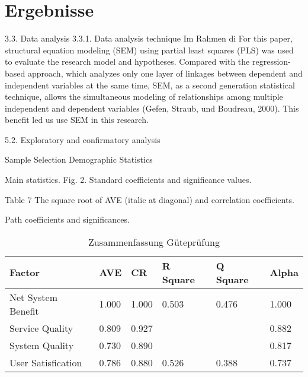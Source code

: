 \section{Ergebnisse}
\label{sec:ergebnisse}


3.3. Data analysis
3.3.1. Data analysis technique
Im Rahmen di
For this paper, structural equation modeling (SEM) using partial least squares (PLS) was used to evaluate the research model and hypotheses. Compared with the regression-based approach, which analyzes only one layer of linkages between dependent and independent variables at the same time, SEM, as a second generation statistical technique, allows the simultaneous modeling of relationships among multiple independent and dependent variables (Gefen, Straub,  und Boudreau, 2000). This benefit led us use SEM in this research.

5.2. Exploratory and confirmatory analysis

Sample Selection
Demographic Statistics

Main statistics.
Fig. 2. Standard coefficients and significance values.

Table 7
The square root of AVE (italic at diagonal) and correlation coefficients.

Path coefficients and significances.












\begin{table}[h] 
\caption{Zusammenfassung G\"utepr\"ufung}
\label{tab:Zusammenfassung} 
\begin{tabular}{|l|l|l|l|l|l|}
  \hline
\textbf{Factor} & \textbf{AVE} & \textbf{CR} & \textbf{R Square} & \textbf{Q Square} & \textbf{Alpha} \\
  \hline
 Net System Benefit & 1.000 & 1.000 & 0.503 & 0.476 & 1.000 \\
  \hline 
 Service Quality & 0.809 & 0.927 & & & 0.882 \\
  \hline
 System Quality & 0.730 & 0.890 & & & 0.817 \\
  \hline
 User Satisfication & 0.786 & 0.880 & 0.526 & 0.388 & 0.737 \\ 
 \hline
\end{tabular}	
\end{table}


